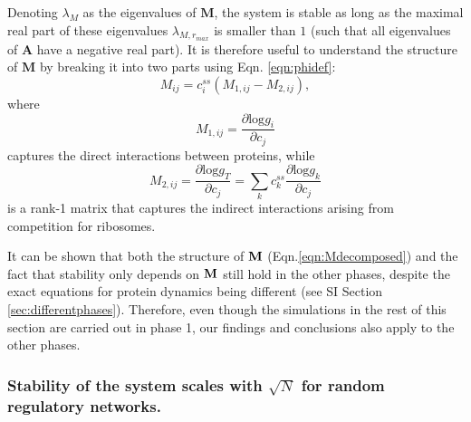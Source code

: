 \documentclass[10pt]{article}
\begin{document}
Denoting $\lambda_M$ as the eigenvalues of $\textbf{M}$, the system is stable as long as the maximal real part of these eigenvalues $\lambda_{M,r_{max}}$ is smaller than $1$ (such that all eigenvalues of $\mathbf{A}$ have a negative real part). It is therefore useful to understand the structure of $\textbf{M}$ by breaking it into two parts using Eqn. \ref{eqn:phidef}:
\begin{equation}
    M_{ij} = c_i^{ss} (M_{1,ij} - M_{2,ij}),
    \label{eqn:Mdecomposed}
\end{equation}
where  
\begin{equation}
    M_{1,ij} = \frac{\partial \text{log} g_i}{\partial c_j}     
    \label{eqn:M1def}
\end{equation}
captures the direct interactions between proteins, while 
\begin{equation}
    M_{2,ij} = \frac{\partial \text{log}g_T}{\partial c_j} = \sum_k c_k^{ss} \frac{\partial \text{log} g_k}{\partial c_j} 
    \label{eqn:M2def}
\end{equation}
is a rank-1 matrix that captures the indirect interactions arising from competition for ribosomes. 

It can be shown that both the structure of $\bf{M}$ (Eqn.\ref{eqn:Mdecomposed}) and the fact that stability only depends on $\bf{M}$ still hold in the other phases, despite the exact equations for protein dynamics being different (see SI Section \ref{sec:differentphases}). Therefore, even though the simulations in the rest of this section are carried out in phase 1, our findings and conclusions also apply to the other phases.  



\subsubsection*{Stability of the system scales with $\sqrt{N}$ for random regulatory networks.}
\end{document}
